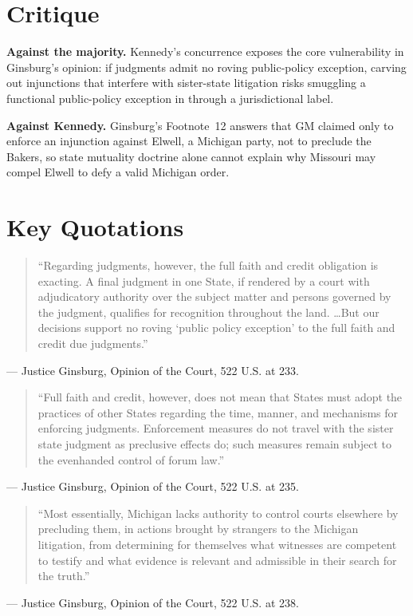 \documentclass[12pt]{article}
\begin{document}
\section{Critique}

\textbf{Against the majority.} Kennedy's concurrence exposes the core vulnerability in Ginsburg's opinion: if judgments admit no roving public-policy exception, carving out injunctions that interfere with sister-state litigation risks smuggling a functional public-policy exception in through a jurisdictional label.

\textbf{Against Kennedy.} Ginsburg's Footnote~12 answers that GM claimed only to enforce an injunction against Elwell, a Michigan party, not to preclude the Bakers, so state mutuality doctrine alone cannot explain why Missouri may compel Elwell to defy a valid Michigan order.

\section{Key Quotations}

\begin{quote}
``Regarding judgments, however, the full faith and credit obligation is exacting. A final judgment in one State, if rendered by a court with adjudicatory authority over the subject matter and persons governed by the judgment, qualifies for recognition throughout the land. \ldots But our decisions support no roving `public policy exception' to the full faith and credit due judgments.''
\end{quote}
\noindent --- Justice Ginsburg, Opinion of the Court, 522 U.S. at 233.

\begin{quote}
``Full faith and credit, however, does not mean that States must adopt the practices of other States regarding the time, manner, and mechanisms for enforcing judgments. Enforcement measures do not travel with the sister state judgment as preclusive effects do; such measures remain subject to the evenhanded control of forum law.''
\end{quote}
\noindent --- Justice Ginsburg, Opinion of the Court, 522 U.S. at 235.

\begin{quote}
``Most essentially, Michigan lacks authority to control courts elsewhere by precluding them, in actions brought by strangers to the Michigan litigation, from determining for themselves what witnesses are competent to testify and what evidence is relevant and admissible in their search for the truth.''
\end{quote}
\noindent --- Justice Ginsburg, Opinion of the Court, 522 U.S. at 238.
\end{document}
